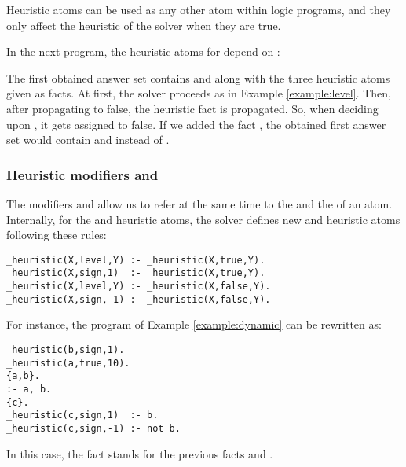 Heuristic atoms can be used as any other atom within logic programs,
and they only affect the heuristic of the solver when they are true.
\begin{example}
\label{example:dynamic}
In the next program, the heuristic atoms for  depend on :

The first obtained answer set contains  and  along with the three heuristic atoms given as facts.
At first, the solver proceeds as in Example \ref{example:level}.
Then, after propagating  to false,  
the heuristic fact  is propagated.
So, when deciding upon , it gets assigned to false.  
If we added the fact ,
the obtained first answer set would contain  and  instead of .
\end{example}

\subsubsection{Heuristic modifiers  and  }

The modifiers  and  allow us to refer at the same time to the  and the  of an atom.
Internally,  for the  and  heuristic atoms,
the solver defines new  and  heuristic atoms following these rules:
\begin{lstlisting}[numbers=none]
_heuristic(X,level,Y) :- _heuristic(X,true,Y).
_heuristic(X,sign,1)  :- _heuristic(X,true,Y).
_heuristic(X,level,Y) :- _heuristic(X,false,Y).
_heuristic(X,sign,-1) :- _heuristic(X,false,Y).
\end{lstlisting}
For instance, the program of Example \ref{example:dynamic}
can be rewritten as:
\begin{lstlisting}[numbers=none]
_heuristic(b,sign,1).
_heuristic(a,true,10).
{a,b}.
:- a, b.
{c}.
_heuristic(c,sign,1)  :- b.
_heuristic(c,sign,-1) :- not b.
\end{lstlisting}
In this case, the fact  stands for the previous
facts  and .

